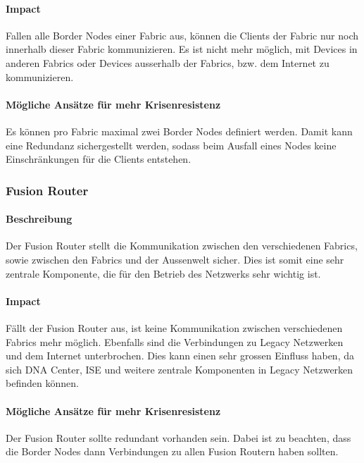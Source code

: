 \paragraph{Impact}

Fallen alle Border Nodes einer Fabric aus, können die Clients der Fabric nur noch innerhalb dieser Fabric kommunizieren. Es ist nicht mehr möglich, mit Devices in anderen Fabrics oder Devices ausserhalb der Fabrics, bzw. dem Internet zu kommunizieren.

\paragraph{Mögliche Ansätze für mehr Krisenresistenz}

Es können pro Fabric maximal zwei Border Nodes definiert werden. Damit kann eine Redundanz sichergestellt werden, sodass beim Ausfall eines Nodes keine Einschränkungen für die Clients entstehen. 

\subsubsection{Fusion Router}

\paragraph{Beschreibung}

Der Fusion Router stellt die Kommunikation zwischen den verschiedenen Fabrics, sowie zwischen den Fabrics und der Aussenwelt sicher. Dies ist somit eine sehr zentrale Komponente, die für den Betrieb des Netzwerks sehr wichtig ist.

\paragraph{Impact}

Fällt der Fusion Router aus, ist keine Kommunikation zwischen verschiedenen Fabrics mehr möglich. Ebenfalls sind die Verbindungen zu Legacy Netzwerken und dem Internet unterbrochen. Dies kann einen sehr grossen Einfluss haben, da sich DNA Center, ISE und weitere zentrale Komponenten in Legacy Netzwerken befinden können.

\paragraph{Mögliche Ansätze für mehr Krisenresistenz}

Der Fusion Router sollte redundant vorhanden sein. Dabei ist zu beachten, dass die Border Nodes dann Verbindungen zu allen Fusion Routern haben sollten.

